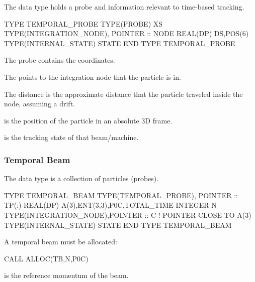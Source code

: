 The data type holds a probe and information relevant to 
time-based tracking.

\begin{ptccode}
TYPE TEMPORAL_PROBE
  TYPE(PROBE) XS
  TYPE(INTEGRATION_NODE), POINTER :: NODE
  REAL(DP) DS,POS(6)
  TYPE(INTERNAL_STATE) STATE
END TYPE TEMPORAL_PROBE
\end{ptccode}

The probe  contains the coordinates.

The  points to the integration node that the particle is in.

The distance  is the approximate distance that the particle
traveled inside the node, assuming a drift.

 is the position of the particle in an absolute 3D frame.

 is the tracking state of that beam/machine.



\subsubsection{Temporal Beam}
\label{sub:Temporal-Beam-B}

The data type is a collection of particles (probes).

\begin{ptccode}
TYPE TEMPORAL_BEAM
  TYPE(TEMPORAL_PROBE), POINTER :: TP(:)
  REAL(DP) A(3),ENT(3,3),P0C,TOTAL_TIME
  INTEGER N
  TYPE(INTEGRATION_NODE),POINTER :: C  ! POINTER CLOSE TO A(3)
  TYPE(INTERNAL_STATE) STATE
END TYPE TEMPORAL_BEAM
\end{ptccode}

A temporal beam must be allocated:

\begin{ptccode}
CALL ALLOC(TB,N,P0C)
\end{ptccode}

 is the reference momentum of the beam.


